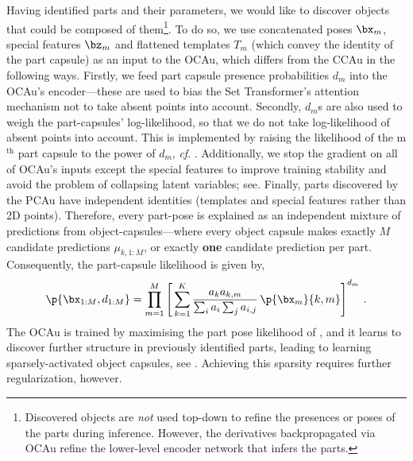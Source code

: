 Having identified parts and their parameters, we would like to discover objects that could be composed of them\footnote{
	Discovered objects are {\it not} used top-down to refine the presences or poses of the parts during inference. However, the derivatives backpropagated via \gls{OCAu} refine the lower-level encoder network that infers the parts.
}.
To do so, we use concatenated poses $\bx_m$, special features $\bz_m$ and flattened templates $T_m$ (which convey the identity of the part capsule)
as an input to the \gls{OCAu}, which differs from the \gls{CCAu} in the following ways.
Firstly, we feed part capsule presence probabilities $d_m$ into the \gls{OCAu}'s encoder---these are used to bias the Set Transformer's attention mechanism not to take absent points into account.
Secondly, $d_m$s are also used to weigh the part-capsules' log-likelihood, so that we do not take log-likelihood of absent points into account. 
This is implemented by raising the likelihood of the m$^\mathrm{th}$ part capsule to the power of $d_m$, \textit{cf}. .
Additionally, we stop the gradient on all of \gls{OCAu}'s inputs except the special features to improve training stability and avoid the problem of collapsing latent variables; see\eg \cite{Rasmus2015ladder}.
Finally, parts discovered by the \gls{PCAu} have independent identities (templates and special features rather than 2D points).
Therefore, every part-pose is explained as an independent mixture of predictions from object-capsules---where every object capsule makes exactly $M$ candidate predictions $\mu_{k,1:M}$, or exactly {\bf one} candidate prediction per part.
Consequently, the part-capsule likelihood is given by,
\begin{equation}
\p{\bx_{1:M}, d_{1:M}} = \prod_{m=1}^M \left[\, \sum_{k=1}^K  
\frac{a_k a_{k,m}}{\sum_i a_i \sum_j a_{i,j}}
\,\p{\bx_m}{k,m}\right]^{d_m}\,. \label{eq:mod_constellation_likelihood}
\end{equation}
The \gls{OCAu} is trained by maximising the part pose likelihood of , and it learns to discover further structure in previously identified parts, leading to learning sparsely-activated object capsules, see .
Achieving this sparsity requires further regularization, however.


